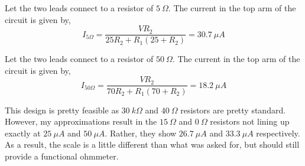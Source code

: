\documentclass{article}
\begin{document}
Let the two leads connect to a resistor of $5\ \si{\Omega}$. The current in the
top arm of the circuit is given by,
$$ I_{5 \si{\Omega}} = \frac{V R_2}{25 R_2 + R_1 (25 + R_2) } = 30.7\ \si{\mu
A} $$

Let the two leads connect to a resistor of $50\ \si{\Omega}$. The current in the
top arm of the circuit is given by,
$$ I_{50 \si{\Omega}} = \frac{V R_2}{70 R_2 + R_1 (70 + R_2) } = 18.2\ \si{\mu
A} $$

This design is pretty feasible as $30\ \si{k\Omega}$ and $40\ \si{\Omega}$
resistors are pretty standard. However, my approximations result in the $15\
\si{\Omega}$ and $0\ \si{\Omega}$ resistors not lining up exactly at $25\
\si{\mu A}$ and $50\ \si{\mu A}$. Rather, they show $26.7\ \si{\mu A}$ and
$33.3\ \si{\mu A}$ respectively. As a result, the scale is a little different
than what was asked for, but should still provide a functional ohmmeter.
\end{document}
